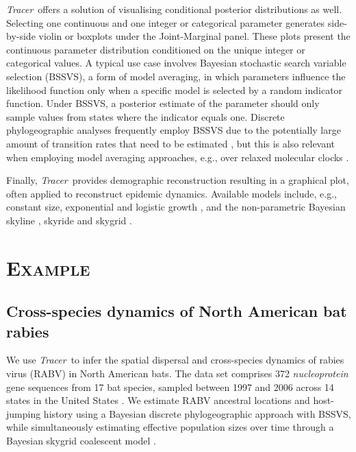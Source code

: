 \documentclass[webpdf,mynatbib,nosurname,nogrid,noCE,noMSC]{SYS}
\newcommand{\tracer}{\emph{Tracer}}
\begin{document}
\tracer\ offers a solution of visualising conditional posterior distributions as well.
Selecting one continuous and one integer or categorical parameter generates side-by-side violin or boxplots under the Joint-Marginal panel.
These plots present the continuous parameter distribution conditioned on the unique integer or categorical values.
A typical use case involves Bayesian stochastic search variable selection (BSSVS), a form of model averaging, in which parameters influence the likelihood function only when a specific model is selected by a random indicator function.
Under BSSVS, a posterior estimate of the parameter should only sample values from states where the indicator equals one.
Discrete phylogeographic analyses frequently employ BSSVS due to the potentially large amount of transition rates that need to be estimated \citep{Lemey2009}, but this is also relevant when employing model averaging approaches, e.g., over relaxed molecular clocks \citep{Li2012}.

Finally, \tracer\ provides demographic reconstruction resulting in a graphical plot, often applied to reconstruct epidemic dynamics.
Available models include, e.g., constant size, exponential and logistic growth \citep{drummond2002estimating},
and the non-parametric Bayesian skyline \citep{drummond2005bayesian,heledDrummond2008}, skyride \citep{minin2008smooth} and skygrid \citep{gill2012improving}.

\vspace{-0.7cm}

\section*{\textsc{Example}}

\subsection*{Cross-species dynamics of North American bat rabies}

We use \tracer\ to infer the spatial dispersal and cross-species dynamics of rabies virus (RABV) in North American bats.
The data set comprises 372 \textit{nucleoprotein} gene sequences from 17 bat species, sampled between 1997 and 2006 across 14 states in the United States \citep{Streicker,Faria2013}.
We estimate RABV ancestral locations and host-jumping history using a Bayesian discrete phylogeographic approach with BSSVS, while simultaneously estimating effective population sizes over time through a Bayesian skygrid coalescent model \citep{gill2012improving}.
\end{document}
